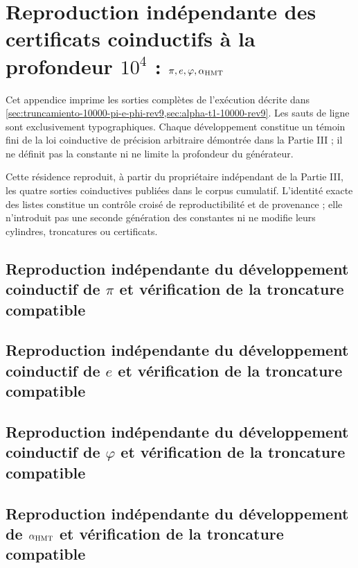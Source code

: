 \chapter{Reproduction indépendante des certificats coinductifs à la profondeur \texorpdfstring{\(10^4\)}{10^4} : \texorpdfstring{\(\pi,e,\varphi,\alpha_{\rm HMT}\)}{pi, e, phi, alpha HMT}}
\label{app:desarrollos-10000-rev9-p3-procedencia}

Cet appendice imprime les sorties complètes de l'exécution décrite dans
\cref{sec:truncamiento-10000-pi-e-phi-rev9,sec:alpha-t1-10000-rev9}. Les
sauts de ligne sont exclusivement typographiques. Chaque développement constitue
un témoin fini de la loi coinductive de précision arbitraire démontrée dans
la Partie III ; il ne définit pas la constante ni ne limite la profondeur du générateur.

\begingroup
\lstset{basicstyle=\ttfamily\tiny,breaklines=true,breakatwhitespace=false,
  frame=single,columns=fullflexible,keepspaces=true,numbers=none}

Cette résidence reproduit, à partir du propriétaire indépendant de la Partie III,
les quatre sorties coinductives publiées dans le corpus cumulatif. L'identité
exacte des listes constitue un contrôle croisé de
reproductibilité et de provenance ; elle n'introduit pas une seconde génération des
constantes ni ne modifie leurs cylindres, troncatures ou certificats.

\section{Reproduction indépendante du développement coinductif de \(\pi\) et vérification de la troncature compatible}


\section{Reproduction indépendante du développement coinductif de \(e\) et vérification de la troncature compatible}


\section{Reproduction indépendante du développement coinductif de \(\varphi\) et vérification de la troncature compatible}



\section{Reproduction indépendante du développement de \texorpdfstring{\(\alpha_{\rm HMT}\)}{alpha HMT} et vérification de la troncature compatible}

\endgroup
